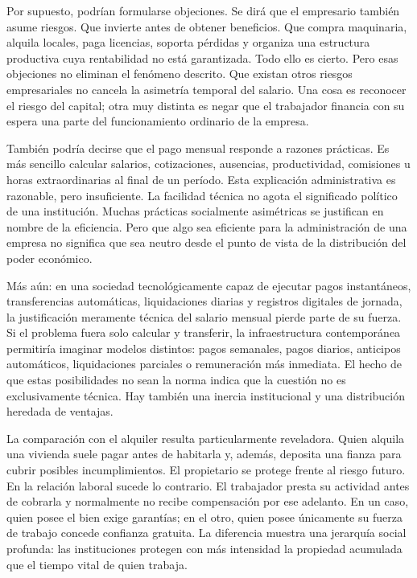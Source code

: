 \documentclass[12pt,a4paper]{article}
\begin{document}
Por supuesto, podrían formularse objeciones. Se dirá que el empresario también asume riesgos. Que invierte antes de obtener beneficios. Que compra maquinaria, alquila locales, paga licencias, soporta pérdidas y organiza una estructura productiva cuya rentabilidad no está garantizada. Todo ello es cierto. Pero esas objeciones no eliminan el fenómeno descrito. Que existan otros riesgos empresariales no cancela la asimetría temporal del salario. Una cosa es reconocer el riesgo del capital; otra muy distinta es negar que el trabajador financia con su espera una parte del funcionamiento ordinario de la empresa.

También podría decirse que el pago mensual responde a razones prácticas. Es más sencillo calcular salarios, cotizaciones, ausencias, productividad, comisiones u horas extraordinarias al final de un período. Esta explicación administrativa es razonable, pero insuficiente. La facilidad técnica no agota el significado político de una institución. Muchas prácticas socialmente asimétricas se justifican en nombre de la eficiencia. Pero que algo sea eficiente para la administración de una empresa no significa que sea neutro desde el punto de vista de la distribución del poder económico.

Más aún: en una sociedad tecnológicamente capaz de ejecutar pagos instantáneos, transferencias automáticas, liquidaciones diarias y registros digitales de jornada, la justificación meramente técnica del salario mensual pierde parte de su fuerza. Si el problema fuera solo calcular y transferir, la infraestructura contemporánea permitiría imaginar modelos distintos: pagos semanales, pagos diarios, anticipos automáticos, liquidaciones parciales o remuneración más inmediata. El hecho de que estas posibilidades no sean la norma indica que la cuestión no es exclusivamente técnica. Hay también una inercia institucional y una distribución heredada de ventajas.

La comparación con el alquiler resulta particularmente reveladora. Quien alquila una vivienda suele pagar antes de habitarla y, además, deposita una fianza para cubrir posibles incumplimientos. El propietario se protege frente al riesgo futuro. En la relación laboral sucede lo contrario. El trabajador presta su actividad antes de cobrarla y normalmente no recibe compensación por ese adelanto. En un caso, quien posee el bien exige garantías; en el otro, quien posee únicamente su fuerza de trabajo concede confianza gratuita. La diferencia muestra una jerarquía social profunda: las instituciones protegen con más intensidad la propiedad acumulada que el tiempo vital de quien trabaja.
\end{document}
